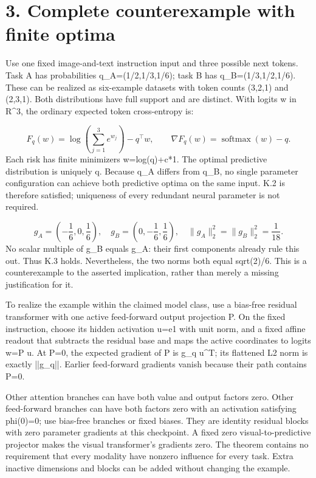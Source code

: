 \documentclass[10pt]{article}
\begin{document}
\section*{3. Complete counterexample with finite optima}
Use one fixed image-and-text instruction input and three possible next tokens. Task A has probabilities q\_A=(1/2,1/3,1/6); task B has q\_B=(1/3,1/2,1/6). These can be realized as six-example datasets with token counts (3,2,1) and (2,3,1). Both distributions have full support and are distinct. With logits w in R\textasciicircum{}3, the ordinary expected token cross-entropy is:\par
\[F_q(w)=\log\!\left(\sum_{j=1}^3e^{w_j}\right)-q^\top w,\qquad \nabla F_q(w)=\operatorname{softmax}(w)-q.\] Each risk has finite minimizers w=log(q)+c*1. The optimal predictive distribution is uniquely q. Because q\_A differs from q\_B, no single parameter configuration can achieve both predictive optima on the same input. K.2 is therefore satisfied; uniqueness of every redundant neural parameter is not required.\par
\[g_A=\left(-\frac16,0,\frac16\right),\quad g_B=\left(0,-\frac16,\frac16\right),\quad \|g_A\|_2^2=\|g_B\|_2^2=\frac1{18}.\] No scalar multiple of g\_B equals g\_A: their first components already rule this out. Thus K.3 holds. Nevertheless, the two norms both equal sqrt(2)/6. This is a counterexample to the asserted implication, rather than merely a missing justification for it.\par
To realize the example within the claimed model class, use a bias-free residual transformer with one active feed-forward output projection P. On the fixed instruction, choose its hidden activation u=e1 with unit norm, and a fixed affine readout that subtracts the residual base and maps the active coordinates to logits w=P u. At P=0, the expected gradient of P is g\_q u\textasciicircum{}T; its flattened L2 norm is exactly ||g\_q||. Earlier feed-forward gradients vanish because their path contains P=0.\par
Other attention branches can have both value and output factors zero. Other feed-forward branches can have both factors zero with an activation satisfying phi(0)=0; use bias-free branches or fixed biases. They are identity residual blocks with zero parameter gradients at this checkpoint. A fixed zero visual-to-predictive projector makes the visual transformer’s gradients zero. The theorem contains no requirement that every modality have nonzero influence for every task. Extra inactive dimensions and blocks can be added without changing the example.\par
\end{document}

